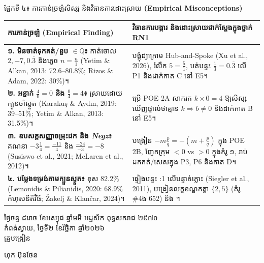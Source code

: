\documentclass[a4paper,10pt]{article}
\renewcommand{\arraystretch}{1.12}
\newcommand{\en}[1]{{\TimesEn #1}}
\newcommand{\enbf}[1]{{\TimesEn\textbf{#1}}}
\begin{document}
\vspace{8pt}
{\muol ផ្នែកទី ៤៖ ការភាន់ច្រឡំសិស្ស និងវិធានការដោះស្រាយ \enbf{(Empirical Misconceptions)}}\\[4pt]
{\fontsize{9.5pt}{13.6pt}\selectfont
\renewcommand{\arraystretch}{1.16}
\begin{tabular}{|L{6.80cm}|L{11.55cm}|}
\hline
{}
\textbf{ការភាន់ច្រឡំ (\en{Empirical Finding})} & \textbf{វិធានការបង្ការ និងដោះស្រាយជាក់ស្ដែងក្នុងថ្នាក់ \enbf{RN1}} \\
\hline
\textbf{១. មិនចាត់ទុកគត់/ខួប $\in\mathbb{Q}$៖} កាត់ចោល $2, -7, 0.\overline{3}$ និងភ្លេច $n=\frac{n}{1}$ (\en{Yetim \& Alkan, 2013}: 72.6--80.8\%; \en{Rizos \& Adam, 2022}: 30\%)។ & បង្គុំដ្យាក្រាម \en{Hub-and-Spoke} (\en{Xu et al., 2026}), រំលឹក $5=\frac{5}{1}$, បត់បន្ទះ $\frac{1}{3}=0.\overline{3}$ លើ \en{P1} និងដាក់កាត \en{C} នៅ \en{E5}។ \\
\hline
\textbf{២. អន្ទាក់ $\frac{4}{0}=0$ និង $\frac{0}{4}=4$៖} ស្រាយដោយក្បួនចាំស្ងួត (\en{Karakuş \& Aydın, 2019}: 39--51\%; \en{Yetim \& Alkan, 2013}: 31.5\%)។ & ប្រើ \en{POE 2A} សាករក $k\times 0 = 4$ ឱ្យសិស្សឃើញផ្ទាល់ថាគ្មាន $k \Rightarrow b\neq 0$ និងដាក់កាត \en{B} នៅ \en{E5}។ \\
\hline
\textbf{៣. ឧបសគ្គសញ្ញាចម្រុះដក និង \en{\textit{Negz}}៖} គណនា $-3\frac{1}{4}=\frac{-11}{4}$ និង $\frac{-24}{-3}=-8$ (\en{Susiswo et al., 2021; McLaren et al., 2012})។ & បង្រៀន $-m\frac{p}{q}=-(m+\frac{p}{q})$ ក្នុង \en{POE 2B}, ញែកក្រុម $<0$ vs $>0$ ក្នុងគំរូ ១, រាប់ដកគត់/សេសក្នុង \en{P3, P6} និងកាត \en{D}។ \\
\hline
\textbf{៤. បម្លែងទម្រង់តាមក្បួនស្ងួត៖} ខុស $82.2\%$ (\en{Lemonidis \& Pilianidis, 2020}: 68.9\% កំហុសនីតិវិធី; \en{Žakelj \& Klančar, 2024})។ & ផ្ទៀងបន្ទះ \en{1:1} លើបន្ទាត់ភ្លោះ (\en{Siegler et al., 2011}), បង្រៀនលក្ខខណ្ឌកត្តា $\{2,5\}$ (គំរូ \#4ង $652$) និង \en{[tracing]}។ \\
\hline
\end{tabular}}

\vspace{10pt}
\hfill
\begin{minipage}{9.8cm}
  {\centering
    ថ្ងៃចន្ទ ៨រោច ខែអស្សុជ ឆ្នាំមមី អដ្ឋស័ក ពុទ្ធសករាជ ២៥៧០\\[2pt]
    កំពង់ស្វាយ, ថ្ងៃទី២ ខែវិច្ឆិកា ឆ្នាំ២០២៦\\[3pt]
    {\muol គ្រូបង្រៀន}\par}
  \vspace{32pt}
  \hfill{\muol ហុក ប៊ុនថែន}\hspace*{1.4cm}
\end{minipage}
\end{document}
